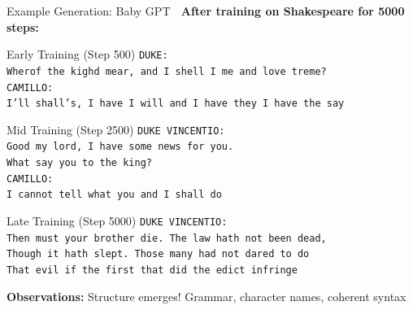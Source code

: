 \documentclass[aspectratio=169]{beamer}
\begin{document}
\begin{frame}{Example Generation: Baby GPT 👶}
\textbf{After training on Shakespeare for 5000 steps:}

\vspace{0.5em}

\begin{block}{Early Training (Step 500)}
\scriptsize
\texttt{DUKE:}\\
\texttt{Wherof the kighd mear, and I shell I me and love treme?}\\
\texttt{CAMILLO:}\\
\texttt{I'll shall's, I have I will and I have they I have the say}
\end{block}

\vspace{0.3em}

\begin{block}{Mid Training (Step 2500)}
\scriptsize
\texttt{DUKE VINCENTIO:}\\
\texttt{Good my lord, I have some news for you.}\\
\texttt{What say you to the king?}\\
\texttt{CAMILLO:}\\
\texttt{I cannot tell what you and I shall do}
\end{block}

\vspace{0.3em}

\begin{block}{Late Training (Step 5000)}
\scriptsize
\texttt{DUKE VINCENTIO:}\\
\texttt{Then must your brother die. The law hath not been dead,}\\
\texttt{Though it hath slept. Those many had not dared to do}\\
\texttt{That evil if the first that did the edict infringe}
\end{block}

\vspace{0.5em}

\textbf{Observations:} Structure emerges! Grammar, character names, coherent syntax
\end{frame}
\end{document}
